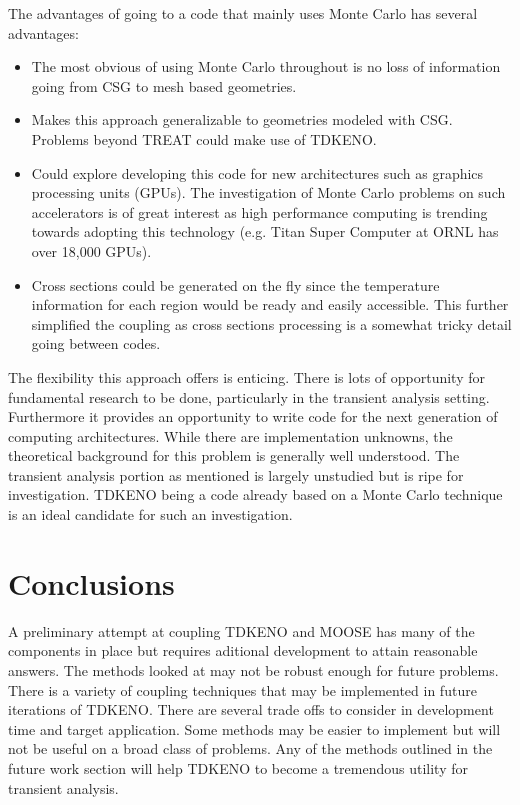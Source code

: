 \documentclass[11pt]{article}
\begin{document}
The advantages of going to a code that mainly uses Monte Carlo has several advantages:
	\begin{itemize}
	\item The most obvious  of using Monte Carlo throughout is no loss of information going from CSG to mesh based geometries. 
	\item Makes this approach generalizable to geometries modeled with CSG. Problems beyond TREAT could make use of TDKENO.  
	\item Could explore developing this code for new architectures such as graphics processing units (GPUs).  The investigation of Monte Carlo problems on such accelerators is of great interest as  high performance computing is trending towards adopting this technology (e.g. Titan Super Computer at ORNL has over 18,000 GPUs). 
	\item Cross sections could be generated on the fly since the temperature information for each region would be ready and easily accessible.  This further simplified the coupling as cross sections processing is a somewhat tricky detail going between codes. 
	\end{itemize}

The flexibility this approach offers is enticing.  There is lots of opportunity for fundamental research to be done, particularly in the transient analysis setting.  Furthermore it provides an opportunity to write code for the next generation of computing architectures.  While there are implementation unknowns, the theoretical background for this problem is generally well understood. The transient analysis portion as mentioned is largely unstudied but is ripe for investigation.  TDKENO being a code already based on a Monte Carlo technique is an ideal candidate for such an investigation.


\section{Conclusions}

A preliminary attempt at coupling TDKENO and MOOSE has many of the components in place but  requires aditional development to attain reasonable answers.  The methods looked at may not be robust enough for future problems.  There is a variety of coupling techniques that may be implemented in future iterations of TDKENO.  There are several trade offs to consider in development time and target application.  Some methods may be easier to implement but will not be useful on a broad class of problems.  Any of the methods outlined in the future work section will help TDKENO to become a tremendous utility for transient analysis. 
\end{document}
